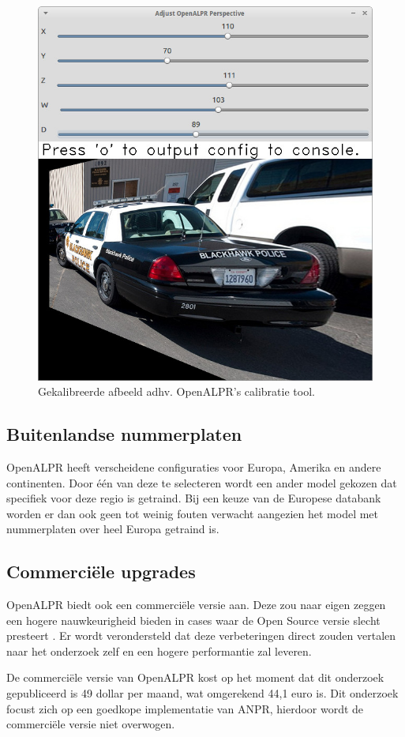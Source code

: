 \begin{figure}[h!]
	\centering
	\includegraphics[width=0.7\linewidth]{img/calibration/configuration_calibration_tool.jpg}
	\caption{Gekalibreerde afbeeld adhv. OpenALPR's calibratie tool. \autocite{openalpr2015pattern}}
	\label{calibration-openalpr-after}
\end{figure}

\subsection{Buitenlandse nummerplaten}
OpenALPR heeft verscheidene configuraties voor Europa, Amerika en andere continenten. Door één van deze te selecteren wordt een ander model gekozen dat specifiek voor deze regio is getraind. Bij een keuze van de Europese databank worden er dan ook geen tot weinig fouten verwacht aangezien het model met nummerplaten over heel Europa getraind is.

\subsection{Commerciële upgrades}
OpenALPR biedt ook een commerciële versie aan. Deze zou naar eigen zeggen een hogere nauwkeurigheid bieden in cases waar de Open Source versie slecht presteert \autocite{openalpr2019benchmark}. Er wordt verondersteld dat deze verbeteringen direct zouden vertalen naar het onderzoek zelf en een hogere performantie zal leveren.

De commerciële versie van OpenALPR kost op het moment dat dit onderzoek gepubliceerd is 49 dollar per maand, wat omgerekend 44,1 euro is. Dit onderzoek focust zich op een goedkope implementatie van ANPR, hierdoor wordt de commerciële versie niet overwogen.